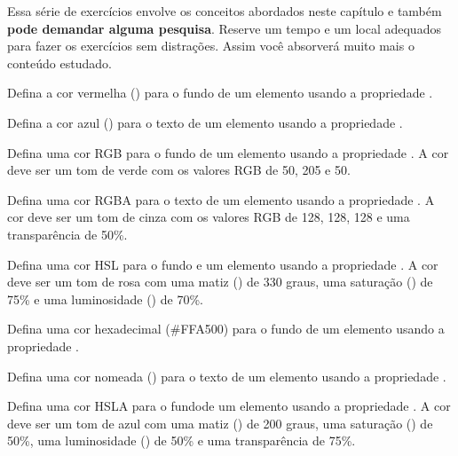 Essa série de exercícios envolve os conceitos abordados neste capítulo e também \textbf{pode demandar alguma pesquisa}. Reserve um tempo e um local adequados para fazer os exercícios sem distrações. Assim você absorverá muito mais o conteúdo estudado.

\begin{exercise}
Defina a cor vermelha () para o fundo de um elemento usando a propriedade .
\end{exercise}

\begin{exercise}
Defina a cor azul () para o texto de um elemento usando a propriedade .
\end{exercise}

\begin{exercise}
Defina uma cor RGB para o fundo de um elemento usando a propriedade . A cor deve ser um tom de verde com os valores RGB de 50, 205 e 50.
\end{exercise}

\begin{exercise}
Defina uma cor RGBA para o texto de um elemento usando a propriedade . A cor deve ser um tom de cinza com os valores RGB de 128, 128, 128 e uma transparência de 50\%.
\end{exercise}

\begin{exercise}
Defina uma cor HSL para o fundo e um elemento usando a propriedade . A cor deve ser um tom de rosa com uma matiz () de 330 graus, uma saturação () de 75\% e uma luminosidade () de 70\%.
\end{exercise}

\begin{exercise}
Defina uma cor hexadecimal (\#FFA500) para o fundo de um elemento usando a propriedade .
\end{exercise}

\begin{exercise}
Defina uma cor nomeada () para o texto de um elemento usando a propriedade .
\end{exercise}

\begin{exercise}
Defina uma cor HSLA para o fundode um elemento usando a propriedade . A cor deve ser um tom de azul com uma matiz () de 200 graus, uma saturação () de 50\%, uma luminosidade () de 50\% e uma transparência de 75\%.
\end{exercise}

